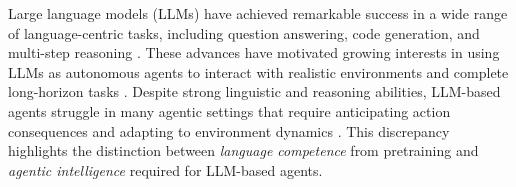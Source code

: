 \documentclass{article}
\theoremstyle{plain}
\theoremstyle{definition}
\theoremstyle{remark}
\begin{document}
Large language models (LLMs) have achieved remarkable success in a wide range of language-centric tasks, including question answering, code generation, and multi-step reasoning \citep{brown2020languagemodelsfewshotlearners,wei2022emergentabilitieslargelanguage,lample2019crosslinguallanguagemodelpretraining,roziere2024codellamaopenfoundation,deepseekai2025deepseekr1incentivizingreasoningcapability,openai2024openaio1card}.
These advances have motivated growing interests in using LLMs as autonomous agents to interact with realistic environments and complete long-horizon tasks \citep{yao2023reactsynergizingreasoningacting,deng2023mind2webgeneralistagentweb}.
Despite strong linguistic and reasoning abilities, LLM-based agents struggle in many agentic settings that require anticipating action consequences and adapting to environment dynamics \citep{liu2025agentbenchevaluatingllmsagents}.
This discrepancy highlights the distinction between \emph{language competence} from pretraining and \emph{agentic intelligence} required for LLM-based agents.
\end{document}
